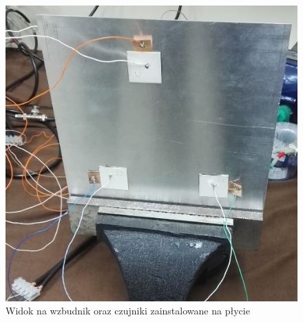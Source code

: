 \documentclass[polish,a4paper,11pt]{mwart}
\begin{document}
\begin{figure}[!tbh]
  \centering
  \includegraphics[width=\textwidth]{./bitgraphics/plate1.jpg}
  \caption{Widok na wzbudnik oraz czujniki zainstalowane na płycie}
  \label{fig:plate1}
\end{figure}
\end{document}
